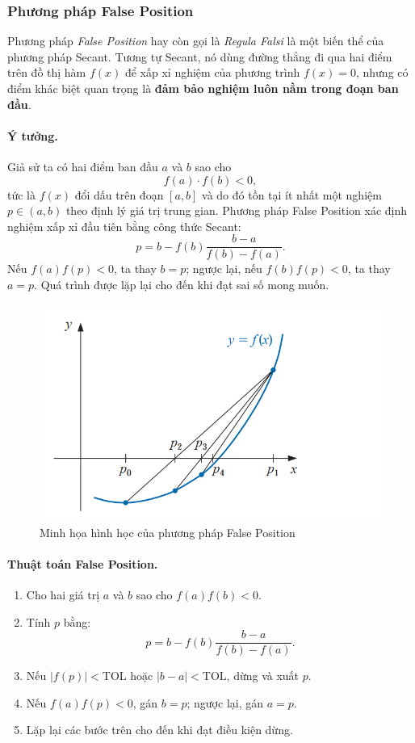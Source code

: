 \subsubsection*{Phương pháp False Position}

Phương pháp \textit{False Position} hay còn gọi là \textit{Regula Falsi} 
là một biến thể của phương pháp Secant. 
Tương tự Secant, nó dùng đường thẳng đi qua hai điểm trên đồ thị hàm $f(x)$ 
để xấp xỉ nghiệm của phương trình $f(x) = 0$, 
nhưng có điểm khác biệt quan trọng là \textbf{đảm bảo nghiệm luôn nằm trong đoạn ban đầu}.

\paragraph*{Ý tưởng.}
Giả sử ta có hai điểm ban đầu $a$ và $b$ sao cho
\[
    f(a) \cdot f(b) < 0,
\]
tức là $f(x)$ đổi dấu trên đoạn $[a, b]$ và do đó tồn tại ít nhất một nghiệm $p \in (a, b)$ 
theo định lý giá trị trung gian.  
Phương pháp False Position xác định nghiệm xấp xỉ đầu tiên bằng công thức Secant:
\[
    p = b - f(b)\frac{b - a}{f(b) - f(a)}.
\]
Nếu $f(a)f(p) < 0$, ta thay $b = p$; ngược lại, nếu $f(b)f(p) < 0$, ta thay $a = p$.  
Quá trình được lặp lại cho đến khi đạt sai số mong muốn.

\begin{figure}[H]
    \centering
    \includegraphics[width=1\linewidth]{figures/fasle position.png}
    \caption{Minh họa hình học của phương pháp False Position}
    \label{fig:placeholder}
\end{figure}


\paragraph*{Thuật toán False Position.}
\begin{enumerate}
    \item Cho hai giá trị $a$ và $b$ sao cho $f(a)f(b) < 0$.
    \item Tính $p$ bằng:
    \[
        p = b - f(b)\frac{b - a}{f(b) - f(a)}.
    \]
    \item Nếu $|f(p)| < \text{TOL}$ hoặc $|b - a| < \text{TOL}$, dừng và xuất $p$.
    \item Nếu $f(a)f(p) < 0$, gán $b = p$; ngược lại, gán $a = p$.
    \item Lặp lại các bước trên cho đến khi đạt điều kiện dừng.
\end{enumerate}

